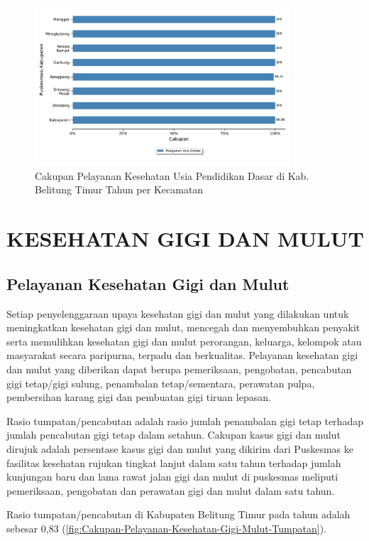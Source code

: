 \begin{figure}[H]
    \centering
    \includegraphics[width=0.85\textwidth]{bab_05/bab_05_26_kesehatanSiswa_spm}
    \caption{Cakupan Pelayanan Kesehatan Usia Pendidikan Dasar di Kab. Belitung Timur Tahun \tP per Kecamatan}
    \label{fig:Cakupan-Pelayanan-Kesehatan-Usia-Dikdas}
\end{figure}

\section{KESEHATAN GIGI DAN MULUT}
\subsection{Pelayanan Kesehatan Gigi dan Mulut}
Setiap penyelenggaraan upaya kesehatan gigi dan mulut yang dilakukan untuk meningkatkan kesehatan gigi dan mulut, mencegah dan menyembuhkan penyakit serta memulihkan kesehatan gigi dan mulut perorangan, keluarga, kelompok atau masyarakat secara paripurna, terpadu dan berkualitas.
Pelayanan kesehatan gigi dan mulut yang diberikan dapat berupa pemeriksaan, pengobatan, pencabutan gigi tetap/gigi sulung, penambalan tetap/sementara, perawatan pulpa, pembersihan karang gigi dan pembuatan gigi tiruan lepasan.

Rasio tumpatan/pencabutan adalah rasio jumlah penambalan gigi tetap terhadap jumlah pencabutan gigi tetap dalam setahun.
Cakupan kasus gigi dan mulut dirujuk adalah persentase kasus gigi dan mulut yang dikirim dari Puskesmas ke fasilitas kesehatan rujukan tingkat lanjut dalam satu tahun terhadap jumlah kunjungan baru dan lama rawat jalan gigi dan mulut di puskesmas meliputi pemeriksaan, pengobatan dan perawatan gigi dan mulut dalam satu tahun.

Rasio tumpatan/pencabutan di Kabupaten Belitung Timur pada tahun \tP adalah sebesar 0,83 (\autoref{fig:Cakupan-Pelayanan-Kesehatan-Gigi-Mulut-Tumpatan}).

